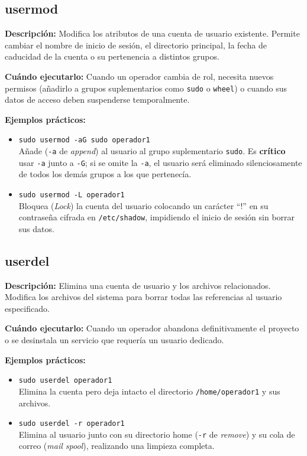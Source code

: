 \documentclass[11pt, a4paper]{article}
\begin{document}
\subsection{usermod}
\textbf{Descripción:} Modifica los atributos de una cuenta de usuario existente. Permite cambiar el nombre de inicio de sesión, el directorio principal, la fecha de caducidad de la cuenta o su pertenencia a distintos grupos.

\textbf{Cuándo ejecutarlo:} Cuando un operador cambia de rol, necesita nuevos permisos (añadirlo a grupos suplementarios como \texttt{sudo} o \texttt{wheel}) o cuando sus datos de acceso deben suspenderse temporalmente.

\textbf{Ejemplos prácticos:}
\begin{itemize}
    \item \texttt{sudo usermod -aG sudo operador1} \\
    Añade (\texttt{-a} de \textit{append}) al usuario al grupo suplementario \texttt{sudo}. Es \textbf{crítico} usar \texttt{-a} junto a \texttt{-G}; si se omite la \texttt{-a}, el usuario será eliminado silenciosamente de todos los demás grupos a los que pertenecía.
    \item \texttt{sudo usermod -L operador1} \\
    Bloquea (\textit{Lock}) la cuenta del usuario colocando un carácter ``!'' en su contraseña cifrada en \texttt{/etc/shadow}, impidiendo el inicio de sesión sin borrar sus datos.
\end{itemize}

\subsection{userdel}
\textbf{Descripción:} Elimina una cuenta de usuario y los archivos relacionados. Modifica los archivos del sistema para borrar todas las referencias al usuario especificado.

\textbf{Cuándo ejecutarlo:} Cuando un operador abandona definitivamente el proyecto o se desinstala un servicio que requería un usuario dedicado.

\textbf{Ejemplos prácticos:}
\begin{itemize}
    \item \texttt{sudo userdel operador1} \\
    Elimina la cuenta pero deja intacto el directorio \texttt{/home/operador1} y sus archivos.
    \item \texttt{sudo userdel -r operador1} \\
    Elimina al usuario junto con su directorio home (\texttt{-r} de \textit{remove}) y su cola de correo (\textit{mail spool}), realizando una limpieza completa.
\end{itemize}
\end{document}
